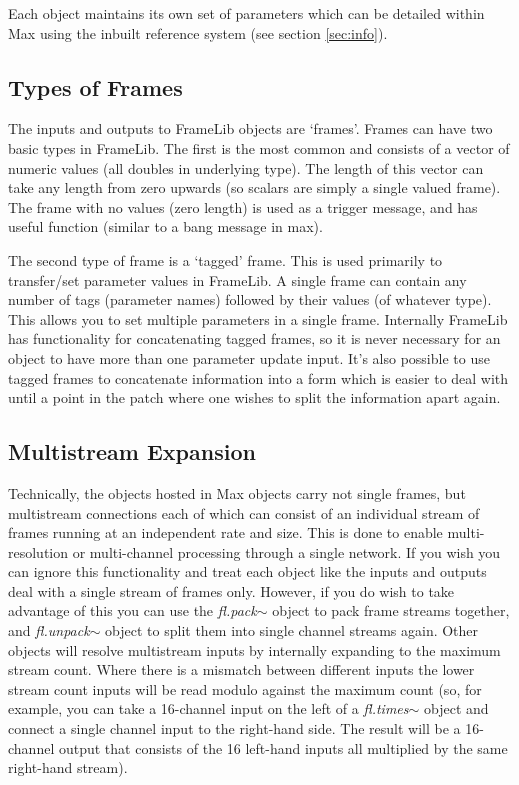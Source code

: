 \documentclass{article}
\newcommand{\flobject}[1]{\textit{fl.#1$\sim$}}
\begin{document}
Each object maintains its own set of parameters which can be detailed within Max using the inbuilt reference system (see section \ref{sec:info}).

\subsection{\label{sec:frametype}Types of Frames}

The inputs and outputs to FrameLib objects are `frames'. Frames can have two basic types in FrameLib. The first is the most common and consists of a vector of numeric values (all doubles in underlying type). The length of this vector can take any length from zero upwards (so scalars are simply a single valued frame). The frame with no values (zero length) is used as a trigger message, and has useful function (similar to a bang message in max). 

The second type of frame is a `tagged' frame. This is used primarily to transfer/set parameter values in FrameLib. A single frame can contain any number of tags (parameter names) followed by their values (of whatever type). This allows you to set multiple parameters in a single frame. Internally FrameLib has functionality for concatenating tagged frames, so it is never necessary for an object to have more than one parameter update input.  It's also possible to use tagged frames to concatenate information into a form which is easier to deal with until a point in the patch where one wishes to split the information apart again.

\subsection{Multistream Expansion}

Technically, the objects hosted in Max objects carry not single frames, but multistream connections each of which can consist of an individual stream of frames running at an independent rate and size. This is done to enable multi-resolution or multi-channel processing through a single network. If you wish you can ignore this functionality and treat each object like the inputs and outputs deal with a single stream of frames only. However, if you do wish to take advantage of this you can use the \flobject{pack} object to pack frame streams together, and \flobject{unpack} object to split them into single channel streams again. Other objects will resolve multistream inputs by internally expanding to the maximum stream count. Where there is a mismatch between different inputs the lower stream count inputs will be read modulo against the maximum count (so, for example, you can take a 16-channel input on the left of a \flobject{times} object and connect a single channel input to the right-hand side. The result will be a 16-channel output that consists of the 16 left-hand inputs all multiplied by the same right-hand stream).
\end{document}
